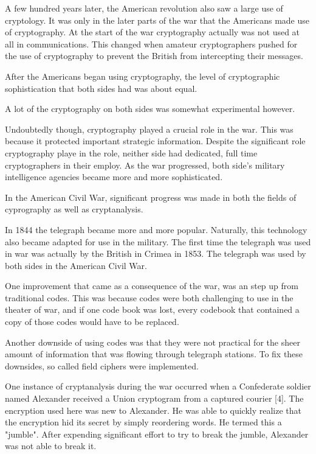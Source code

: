 \documentclass{article}
\begin{document}
    A few hundred years later, the American revolution also saw a large
    use of cryptology. It was only in the later parts of the war
    that the Americans made use of cryptography.
    At the start of the war cryptography actually was not used at all
    in communications. This changed when amateur cryptographers
     pushed for the use of cryptography to prevent the British
    from intercepting their messages.

    After the Americans began using cryptography, the level of
    cryptographic sophistication that both sides had was about equal.

    A lot of the cryptography on both sides was somewhat experimental however.

    Undoubtedly though, cryptography played a crucial role in the war.
    This was because it protected important strategic information.
    Despite the significant role cryptography playe in the role,
    neither side had dedicated, full time cryptographers in their employ.
    As the war progressed, both side's military intelligence agencies
    became more and more sophisticated.

    In the American Civil War, significant progress was made in
    both the fields of cyprography as well as cryptanalysis.

    In 1844 the telegraph became more and more popular. Naturally,
    this technology also became adapted for use in the military.
    The first time the telegraph was used in war was actually by
    the British in Crimea in 1853.
    The telegraph was used by both sides in the American Civil War.

    One improvement that came as a consequence of the war,
    was an step up from traditional codes. This was because
    codes were both challenging to use in the theater of war,
    and if one code book was lost, every codebook that contained
    a copy of those codes would have to be replaced.

    Another downside of using codes was that they were not practical for
    the sheer amount of information that was flowing through telegraph
    stations.
    To fix these downsides, so called field ciphers were implemented.

    One instance of cryptanalysis during the war occurred when a
    Confederate soldier named Alexander received a Union cryptogram
    from a captured courier [4].
    The encryption used here was new to Alexander. He was able
    to quickly realize that the encryption hid its secret by simply
    reordering words. He termed this a "jumble". After expending significant
    effort to try to break the jumble, Alexander was not able to break it.
\end{document}
